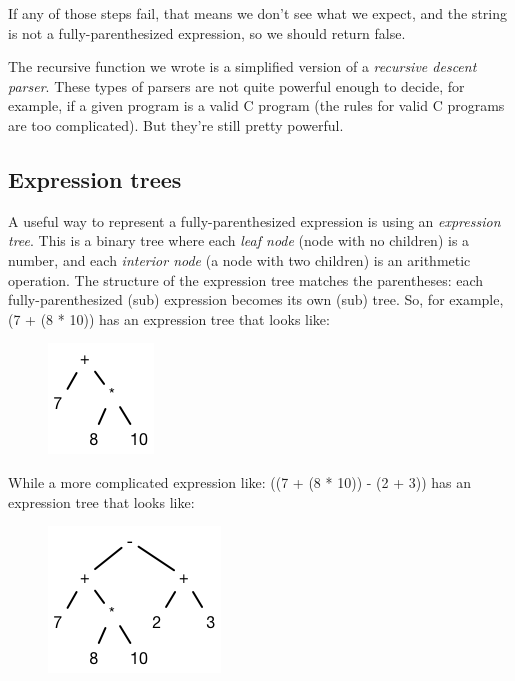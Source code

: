 \documentclass{article}
\begin{document}
If any of those steps fail, that means we don't see what we expect, and the string is not a fully-parenthesized expression, so we should return \textsf{false}.


    The recursive function we wrote is a simplified version of a {\em recursive descent parser}. These types of parsers are not quite powerful enough to decide, for example, if a given program is a valid C program (the rules for valid C programs are too complicated). But they're still pretty powerful.

\subsection{Expression trees}

A useful way to represent a fully-parenthesized expression is using an {\em expression tree}. This is a binary tree where each {\em leaf node} (node with no children) is a number, and each {\em interior node} (a node with two children) is an arithmetic operation. The structure of the expression tree matches the parentheses: each fully-parenthesized (sub) expression becomes its own (sub) tree. So, for example, \textsf{(7 + (8 * 10))} has an expression tree that looks like:

\begin{figure}[H]
\centering
\includegraphics[scale=0.5]{exptree1.png}
\end{figure}

While a more complicated expression like: ((7 + (8 * 10)) - (2 + 3)) has an expression tree that looks like:

\begin{figure}[H]
\centering
\includegraphics[scale=0.5]{exptree2.png}
\end{figure}
\end{document}

